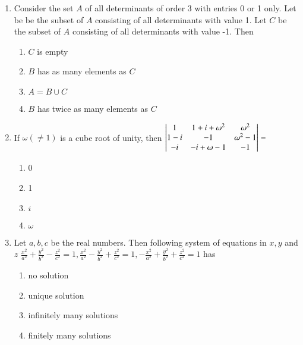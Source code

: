 \documentclass[journal,12pt,twocolumn]{IEEEtran}
\theoremstyle{remark}
\begin{document}
\begin{enumerate}[label=\arabic*.]
	\item Consider the set $A$ of all determinants of order 3 with entries
		0 or 1 only. Let be be the subset of $A$ consisting of all
		determinants with value 1. Let $C$ be the subset of $A$ consisting
		of all determinants with value -1. Then
		\hfill {}
		\begin{enumerate}[label=(\alph*)]
			\item $C$ is empty
			\item $B$ has as many elements as $C$
			\item $A = B \cup C$
			\item $B$ has twice as many elements as $C$
		\end{enumerate}

	\item If $\omega (\ne 1)$ is a cube root of unity, then
		$\begin{vmatrix}
			1 & 1 + i + \omega^2 & \omega^2 \\
			1 - i & -1 & \omega^2 - 1 \\
			-i & -i + \omega - 1 & -1
		\end{vmatrix} = $
		\hfill {}
	
		\begin{multicols}{4}
			\begin{enumerate}[label=(\alph*)]
				\item 0
				\item 1
				\item $i$
				\item $\omega$
			\end{enumerate}
		\end{multicols}

	\item Let $a, b, c$ be the real numbers. Then following system of
		equations in $x, y$ and $z$ 
		\hfill \brak{1995S}
		$
		\frac{x^2}{a^2} + \frac{y^2}{b^2} - \frac{z^2}{c^2} = 1	,
		\frac{x^2}{a^2} - \frac{y^2}{b^2} + \frac{z^2}{c^2} = 1	,
		-\frac{x^2}{a^2} + \frac{y^2}{b^2} + \frac{z^2}{c^2} = 1
		$ has

		\begin{multicols}{2}
			\begin{enumerate}[label=(\alph*)]
				\item no solution
				\item unique solution
				\columnbreak
				\item infinitely many solutions
				\item finitely many solutions
			\end{enumerate}
		\end{multicols}




\end{enumerate}
\end{document}

